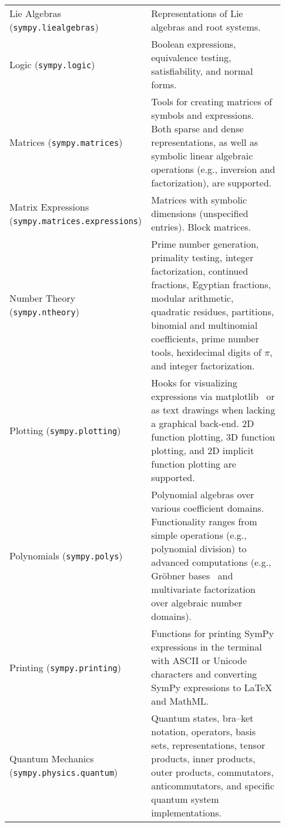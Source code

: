 \begin{longtable}[htbc]{>{\raggedright}p{0.30\linewidth}p{0.63\linewidth}}
Lie Algebras (\texttt{sympy.liealgebras}) & Representations of Lie algebras and root systems.\\

Logic (\texttt{sympy.logic}) & Boolean expressions, equivalence testing, satisfiability, and normal
forms.\\

Matrices (\texttt{sympy.matrices}) & Tools for creating matrices of symbols and expressions.
Both sparse and dense representations, as well as symbolic linear
algebraic operations (e.g., inversion and factorization), are
supported.\\

Matrix Expressions (\texttt{sympy.matrices.expressions}) & Matrices with symbolic dimensions (unspecified entries).
Block matrices.\\

Number Theory (\texttt{sympy.ntheory}) & Prime number generation, primality testing, integer
factorization, continued fractions, Egyptian fractions, modular arithmetic,
quadratic residues, partitions, binomial and multinomial coefficients,
prime number tools, hexidecimal digits of $\pi$, and integer factorization. \\

Plotting (\texttt{sympy.plotting}) & Hooks for visualizing expressions via matplotlib~\cite{Hunter:2007}
or as text drawings when lacking a graphical back-end. 2D function plotting,
3D function
plotting, and 2D implicit function plotting are supported.\\

Polynomials (\texttt{sympy.polys}) & Polynomial algebras over various coefficient domains.
Functionality ranges from simple operations (e.g., polynomial division) to
advanced computations (e.g., Gr\"obner bases~\cite{adams1994introduction} and multivariate
factorization over algebraic number domains).\\

Printing (\texttt{sympy.printing}) & Functions for printing SymPy expressions in the terminal with ASCII
or Unicode characters and converting SymPy expressions to \LaTeX{} and
MathML.\\

Quantum Mechanics (\texttt{sympy.physics.quantum}) & Quantum states, bra--ket notation, operators, basis sets,
representations, tensor products, inner products, outer products, commutators,
anticommutators, and specific quantum system implementations.\\


\end{longtable}

